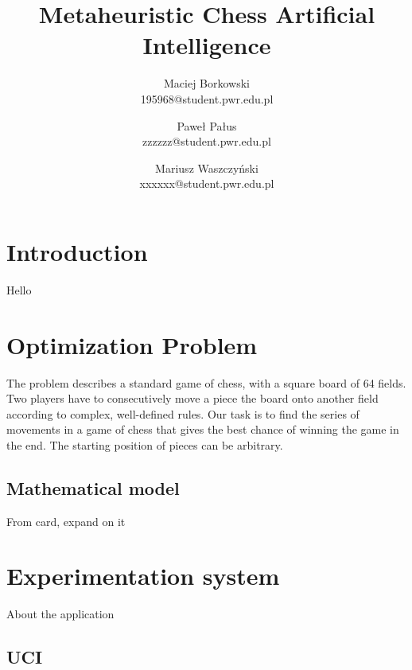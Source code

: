 \documentclass[pdftex]{article}
\date{}
\title{Metaheuristic Chess Artificial Intelligence}
\author{Maciej Borkowski\\ 195968@student.pwr.edu.pl \and Paweł Pałus\\ zzzzzz@student.pwr.edu.pl  \and Mariusz Waszczyński\\  xxxxxx@student.pwr.edu.pl }
\begin{document}
\thispagestyle{empty}

\section{Introduction}
\label{sec:introduction}

Hello

\section{Optimization Problem}
\label{sec:problem}

The problem describes a standard game of chess, with a square board of 64 fields. Two players have to consecutively move a piece the board onto another field according to complex, well-defined rules. Our task is to find the series of movements in a game of chess that gives the best chance of winning the game in the end. The starting position of pieces can be arbitrary.

\subsection{Mathematical model}
\label{sec:model}

From card, expand on it

\section{Experimentation system}
\label{sec:project}

About the application

\subsection{UCI}
\label{sec:uci}
\end{document}
